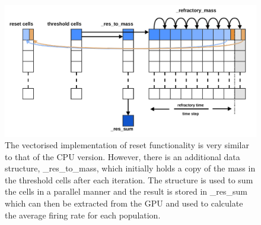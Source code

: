 \documentclass[utf8]{frontiers_suppmat} %
\begin{document}
\begin{figure}[!h]
  \centering
  \includegraphics[width=\columnwidth]{images/neuroinformatics_reset.pdf}
  \caption{The vectorised implementation of reset functionality is very similar to that of the CPU version. However, there is an additional data structure, \_res\_to\_mass, which initially holds a copy of the mass in the threshold cells after each iteration. The structure is used to sum the cells in a parallel manner and the result is stored in \_res\_sum which can then be extracted from the GPU and used to calculate the average firing rate for each population.}
  \label{fig:cudareset}
\end{figure}
\end{document}
